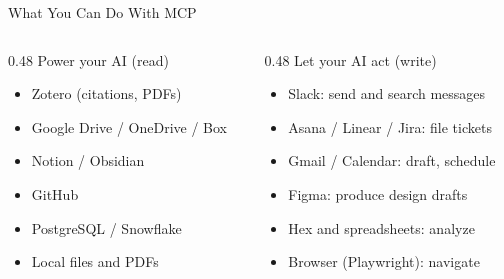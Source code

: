 \documentclass[aspectratio=169]{beamer}
\begin{document}
\begin{frame}{What You Can Do With MCP}
    \begin{columns}[T]
        \begin{column}{0.48\textwidth}
            Power your AI (read)
            \vspace{0.5em}
            \begin{itemize}
                \item Zotero (citations, PDFs)
                \vspace{0.4em}
                \item Google Drive / OneDrive / Box
                \vspace{0.4em}
                \item Notion / Obsidian
                \vspace{0.4em}
                \item GitHub
                \vspace{0.4em}
                \item PostgreSQL / Snowflake
                \vspace{0.4em}
                \item Local files and PDFs
            \end{itemize}
        \end{column}
        \begin{column}{0.48\textwidth}
            Let your AI act (write)
            \vspace{0.5em}
            \begin{itemize}
                \item Slack: send and search messages
                \vspace{0.4em}
                \item Asana / Linear / Jira: file tickets
                \vspace{0.4em}
                \item Gmail / Calendar: draft, schedule
                \vspace{0.4em}
                \item Figma: produce design drafts
                \vspace{0.4em}
                \item Hex and spreadsheets: analyze
                \vspace{0.4em}
                \item Browser (Playwright): navigate
            \end{itemize}
        \end{column}
    \end{columns}
\end{frame}
\end{document}
